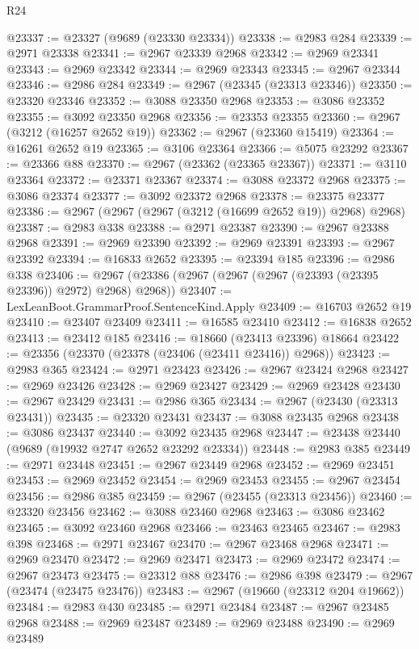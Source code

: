 \begin{lexlean}{R24}
\begin{coremodule}
@23337 := @23327 (@9689 (@23330 @23334))
@23338 := @2983 @284
@23339 := @2971 @23338
@23341 := @2967 @23339 @2968
@23342 := @2969 @23341
@23343 := @2969 @23342
@23344 := @2969 @23343
@23345 := @2967 @23344
@23346 := @2986 @284
@23349 := @2967 (@23345 (@23313 @23346))
@23350 := @23320 @23346
@23352 := @3088 @23350 @2968
@23353 := @3086 @23352
@23355 := @3092 @23350 @2968
@23356 := @23353 @23355
@23360 := @2967 (@3212 (@16257 @2652 @19))
@23362 := @2967 (@23360 @15419)
@23364 := @16261 @2652 @19
@23365 := @3106 @23364
@23366 := @5075 @23292
@23367 := @23366 @88
@23370 := @2967 (@23362 (@23365 @23367))
@23371 := @3110 @23364
@23372 := @23371 @23367
@23374 := @3088 @23372 @2968
@23375 := @3086 @23374
@23377 := @3092 @23372 @2968
@23378 := @23375 @23377
@23386 := @2967 (@2967 (@2967 (@3212 (@16699 @2652 @19)) @2968) @2968)
@23387 := @2983 @338
@23388 := @2971 @23387
@23390 := @2967 @23388 @2968
@23391 := @2969 @23390
@23392 := @2969 @23391
@23393 := @2967 @23392
@23394 := @16833 @2652
@23395 := @23394 @185
@23396 := @2986 @338
@23406 := @2967 (@23386 (@2967 (@2967 (@2967 (@23393 (@23395 @23396)) @2972) @2968) @2968))
@23407 := LexLeanBoot.GrammarProof.SentenceKind.Apply
@23409 := @16703 @2652 @19
@23410 := @23407 @23409
@23411 := @16585 @23410
@23412 := @16838 @2652
@23413 := @23412 @185
@23416 := @18660 (@23413 @23396) @18664
@23422 := @23356 (@23370 (@23378 (@23406 (@23411 @23416)) @2968))
@23423 := @2983 @365
@23424 := @2971 @23423
@23426 := @2967 @23424 @2968
@23427 := @2969 @23426
@23428 := @2969 @23427
@23429 := @2969 @23428
@23430 := @2967 @23429
@23431 := @2986 @365
@23434 := @2967 (@23430 (@23313 @23431))
@23435 := @23320 @23431
@23437 := @3088 @23435 @2968
@23438 := @3086 @23437
@23440 := @3092 @23435 @2968
@23447 := @23438 @23440 (@9689 (@19932 @2747 @2652 @23292 @23334))
@23448 := @2983 @385
@23449 := @2971 @23448
@23451 := @2967 @23449 @2968
@23452 := @2969 @23451
@23453 := @2969 @23452
@23454 := @2969 @23453
@23455 := @2967 @23454
@23456 := @2986 @385
@23459 := @2967 (@23455 (@23313 @23456))
@23460 := @23320 @23456
@23462 := @3088 @23460 @2968
@23463 := @3086 @23462
@23465 := @3092 @23460 @2968
@23466 := @23463 @23465
@23467 := @2983 @398
@23468 := @2971 @23467
@23470 := @2967 @23468 @2968
@23471 := @2969 @23470
@23472 := @2969 @23471
@23473 := @2969 @23472
@23474 := @2967 @23473
@23475 := @23312 @88
@23476 := @2986 @398
@23479 := @2967 (@23474 (@23475 @23476))
@23483 := @2967 (@19660 (@23312 @204 @19662))
@23484 := @2983 @430
@23485 := @2971 @23484
@23487 := @2967 @23485 @2968
@23488 := @2969 @23487
@23489 := @2969 @23488
@23490 := @2969 @23489

\end{coremodule}
\end{lexlean}
